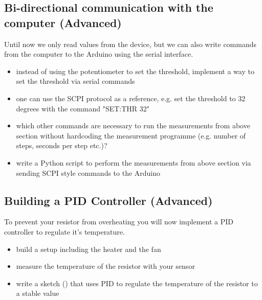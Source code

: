 \subsection{Bi-directional communication with the computer (Advanced)}
Until now we only read values from the device, but we can also write commands from the computer to the Arduino using the serial interface.
\begin{itemize}
	\item instead of using the potentiometer to set the threshold, implement a way to set the threshold via serial commands
	\item one can use the SCPI protocol as a reference, e.g. set the threshold to 32 degrees with the command "SET:THR 32"
	\item which other commands are necessary to run the measurements from above section without hardcoding the measurement programme (e.g. number of steps, seconds per step etc.)?
	\item write a Python script to perform the measurements from above section via sending SCPI style commands to the Arduino
\end{itemize}



\subsection{Building a PID Controller (Advanced)}
To prevent your resistor from overheating you will now implement a \ac{PID} controller to regulate it's temperature.
\begin{itemize}
	\item build a setup including the heater and the fan
	\item measure the temperature of the resistor with your sensor
	\item write a sketch () that uses \ac{PID} to regulate the temperature of the resistor to a stable value
\end{itemize}












